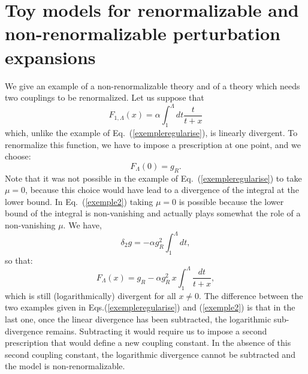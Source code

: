 \documentclass[floatfix,preprintnumbers,amsmath,amssymb,prb,12pt]{revtex4-1}
\begin{document}
{{\section{Toy models for renormalizable and non-renormalizable
perturbation expansions} We give an example of a non-renormalizable
theory and of a theory which needs two couplings to be
renormalized. 
Let us suppose that 
\begin{equation}
F_{1,\Lambda}(x)= \alpha \!\int_1^\Lambda dt \frac{t}{t+x}
\label{exemple2}
\end{equation}
which, unlike the example of Eq.~(\ref{exempleregularise}), is
linearly divergent. To renormalize this function, we have to impose
a prescription at one point, and we choose:
\begin{equation}
F_{\Lambda}(0)= g_R.
\label{pres_exemple2}
\end{equation}
Note that it was not possible in the example 
of Eq.~(\ref{exempleregularise}) to take $\mu=0$, because this
choice would have lead to a divergence of the integral at the lower
bound. In Eq.~(\ref{exemple2}) taking $\mu=0$ is possible
because the lower bound of the integral
is non-vanishing and actually plays somewhat the role of a
non-vanishing $\mu$. We have,
\begin{equation}
\delta_2 g= -\alpha g_R^2 \int_1^\Lambda dt,
\end{equation}
so that:
\begin{equation}
F_{\Lambda}(x)=g_R - \alpha g_R^2\, x\! \int_1^\Lambda
\frac{dt}{t+x},
\end{equation}
which is still (logarithmically) divergent for all $x\ne 0$. The
difference between the two examples given in Eqs.(\ref{exempleregularise}) and (\ref{exemple2}) is that in the last one, once
the linear divergence has been subtracted, the logarithmic
sub-divergence remains. Subtracting it would require us to impose a
second prescription that would define a new coupling constant. In
the absence of this second coupling constant, the logarithmic
divergence cannot be subtracted and the model is
non-renormalizable.

}}
\end{document}
